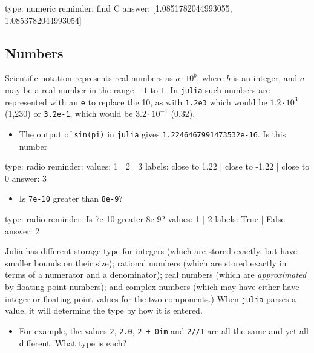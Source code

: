 \documentclass[12pt]{article}
\begin{document}
\begin{answer}
    type: numeric
    reminder: find C
    answer: [1.0851782044993055, 1.0853782044993054]

\end{answer}

\subsection{Numbers}

Scientific notation represents real numbers as $a \cdot 10^b$, where $b$
is an integer, and $a$ may be a real number in the range $-1$ to $1$. In
\texttt{julia} such numbers are represented with an \texttt{e} to
replace the 10, as with \texttt{1.2e3} which would be $1.2 \cdot 10^3$
(1,230) or \texttt{3.2e-1}, which would be $3.2 \cdot 10^{-1}$ (0.32).

\begin{itemize}
\itemsep1pt\parskip0pt
\item
  The output of \texttt{sin(pi)} in \texttt{julia} gives
  \texttt{1.2246467991473532e-16}. Is this number
\end{itemize}

\begin{answer}
type: radio
reminder: 
values: 1 | 2 | 3
labels: close to 1.22 | close to -1.22 | close to 0
answer: 3
\end{answer}

\begin{itemize}
\itemsep1pt\parskip0pt
\item
  Is \texttt{7e-10} greater than \texttt{8e-9}?
\end{itemize}

\begin{answer}
type: radio
reminder: Is 7e-10 greater 8e-9?
values: 1 | 2
labels: True | False
answer: 2
\end{answer}

Julia has different storage type for integers (which are stored exactly,
but have smaller bounds on their size); rational numbers (which are
stored exactly in terms of a numerator and a denominator); real numbers
(which are \emph{approximated} by floating point numbers); and complex
numbers (which may have either have integer or floating point values for
the two components.) When \texttt{julia} parses a value, it will
determine the type by how it is entered.

\begin{itemize}
\itemsep1pt\parskip0pt
\item
  For example, the values \texttt{2}, \texttt{2.0}, \texttt{2 + 0im} and
  \texttt{2//1} are all the same and yet all different. What type is
  each?
\end{itemize}
\end{document}
